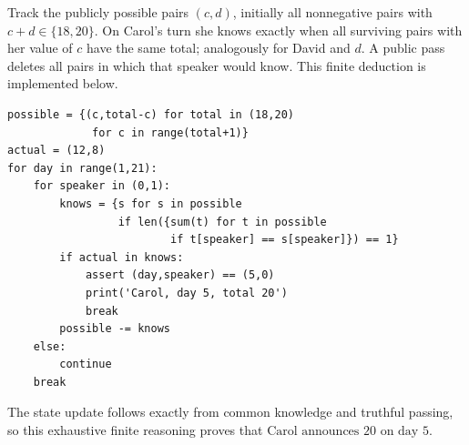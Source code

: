Track the publicly possible pairs $(c,d)$, initially all nonnegative pairs with $c+d\in\{18,20\}$. On Carol's turn she knows exactly when all surviving pairs with her value of $c$ have the same total; analogously for David and $d$. A public pass deletes all pairs in which that speaker would know. This finite deduction is implemented below.
\begin{verbatim}
possible = {(c,total-c) for total in (18,20)
             for c in range(total+1)}
actual = (12,8)
for day in range(1,21):
    for speaker in (0,1):
        knows = {s for s in possible
                 if len({sum(t) for t in possible
                         if t[speaker] == s[speaker]}) == 1}
        if actual in knows:
            assert (day,speaker) == (5,0)
            print('Carol, day 5, total 20')
            break
        possible -= knows
    else:
        continue
    break
\end{verbatim}
The state update follows exactly from common knowledge and truthful passing, so this exhaustive finite reasoning proves that $\boxed{\text{Carol announces 20 on day 5}}$.
